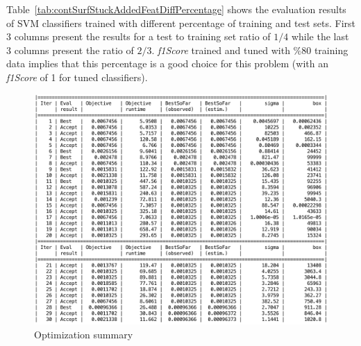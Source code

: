 Table~\ref{tab:contSurfStuckAddedFeatDiffPercentage} shows the evaluation results of SVM classifiers trained with different percentage of training and test sets. 
First 3 columns present the results for a test to training set ratio of $1/4$ while the last 3 columns present the ratio of $2/3$. \emph{f1Score} trained and tuned with $\%80$ training data implies that this percentage is a good choice for this problem (with an \emph{f1Score} of 1 for tuned classifiers). 

\iffalse

\begin{figure}
\begin{center}
\includegraphics[width=15cm]{figures/optimizationSummaryStuckFault}    %
\caption{Optimization summary} 
\label{fig:optimizationSummaryStuckFault}
\end{center}
\end{figure}

